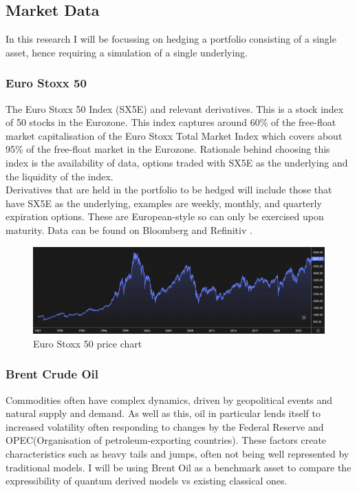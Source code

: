 \documentclass[12pt]{article}
\numberwithin{equation}{section}
\begin{document}
\subsection{Market Data}
In this research I will be focussing on hedging a portfolio consisting of a single 
asset, hence requiring a simulation of a single underlying. 
\subsubsection{Euro Stoxx 50}
The Euro Stoxx 50 Index (SX5E) and relevant derivatives. This is a stock index of 50 stocks in the Eurozone. 
This index captures around 60\% of the free-float market capitalisation of the 
Euro Stoxx Total Market Index which covers about 95\% of the free-float market 
in the Eurozone\autocite{a2021_euro}. Rationale behind choosing this index is the availability of data,
options traded with SX5E as the underlying and the liquidity of the index.
\\
Derivatives that are held in the portfolio to be hedged will include those that 
have SX5E as the underlying, examples are weekly, monthly, and quarterly
expiration options. These are European-style so can only be exercised upon 
maturity. Data can be found on Bloomberg\autocite{bloomberg_2023_bloomberg} and Refinitiv
\autocite{lseg}.
\begin{figure}[h]
    \centering
    \includegraphics[scale=0.35]{sx5e.png}
    \caption{Euro Stoxx 50 price chart}
\end{figure}

\subsubsection{Brent Crude Oil}
Commodities often have complex dynamics, driven by geopolitical events and natural 
supply and demand. As well as this, oil in particular lends itself to increased
volatility often responding to changes by the Federal Reserve and OPEC(Organisation 
of petroleum-exporting countries). These factors create characteristics such as 
heavy tails and jumps, often not being well represented by traditional models. 
I will be using Brent Oil as a benchmark asset to compare the expressibility of 
quantum derived models vs existing classical ones. 
\end{document}

